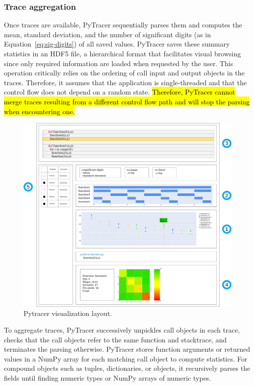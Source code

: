 \documentclass[10pt,journal,compsoc]{IEEEtran}
\newcommand{\pytracer}[0]{PyTracer\xspace}
\DeclareRobustCommand{\add}[1]{\sethlcolor{lightgreen}\hl{#1}}
\begin{document}
\subsubsection{Trace aggregation}

Once traces are available, \pytracer sequentially parses them and computes the
mean, standard deviation, and the number of significant digits (as in
Equation~\ref{eq:sig-digits}) of all saved values. \pytracer saves these summary
statistics in an HDF5 file, a hierarchical format that facilitates visual
browsing since only required information are loaded when requested by the user.
This operation critically relies on the ordering of call input and output
objects in the traces. Therefore, it assumes that the application is
single-threaded and that the control flow does not depend on a random state.
\add{Therefore, \mbox{\pytracer} cannot merge traces resulting from a different
    control flow path and will stop the parsing when encountering one.}

\begin{figure}
    \centering
    \includegraphics[width=0.75\linewidth]{figure/pytracer_layout.pdf}
    \caption{Pytracer visualization layout.}
    \label{fig:visu-layout}
\end{figure}


To aggregate traces, \pytracer successively unpickles call objects in each
trace, checks that the call objects refer to the same function and stacktrace,
and terminates the parsing otherwise. PyTracer stores function arguments or
returned values in a NumPy array for each matching call object to compute
statistics. For compound objects such as tuples, dictionaries, or objects, it
recursively parses the fields until finding numeric types or NumPy arrays of
numeric types.
\end{document}
